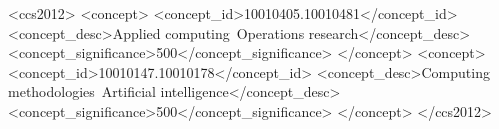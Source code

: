\documentclass[sigconf, nonacm]{acmart}
\begin{document}

\begin{CCSXML}
<ccs2012>
   <concept>
       <concept_id>10010405.10010481</concept_id>
       <concept_desc>Applied computing~Operations research</concept_desc>
       <concept_significance>500</concept_significance>
       </concept>
   <concept>
       <concept_id>10010147.10010178</concept_id>
       <concept_desc>Computing methodologies~Artificial intelligence</concept_desc>
       <concept_significance>500</concept_significance>
       </concept>
 </ccs2012>
\end{CCSXML}


\end{document}
